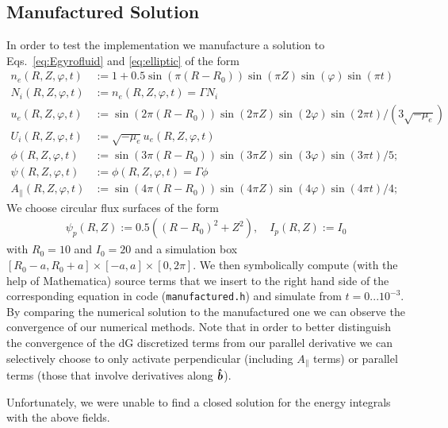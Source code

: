 \subsection{Manufactured Solution}
In order to test the implementation we manufacture a solution to Eqs.~\eqref{eq:Egyrofluid} and \eqref{eq:elliptic} of the form
\begin{align*}
n_e(R,Z,\varphi, t) &:= 1 + 0.5\sin(\pi(R-R_0))\sin(\pi Z)\sin(\varphi)\sin(\pi t) \\
N_i(R,Z,\varphi, t) &:= n_e(R,Z,\varphi,t) = \Gamma N_i  \\
u_e(R,Z,\varphi, t) &:= \sin(2\pi(R-R_0))\sin(2\pi Z)\sin(2\varphi)\sin(2\pi t)/(3\sqrt{-\mu_e}) \\
U_i(R,Z,\varphi, t) &:= \sqrt{-\mu_e}u_e(R,Z,\varphi,t) \\
\phi(R,Z,\varphi,t) &:= \sin(3\pi(R-R_0))\sin(3\pi Z)\sin(3\varphi)\sin(3\pi t)/5; \\
\psi(R,Z,\varphi,t) &:= \phi(R,Z,\varphi, t) = \Gamma \phi \\
A_\parallel( R,Z,\varphi,t) &:= \sin(4\pi(R-R_0))\sin(4\pi Z)\sin(4\varphi)\sin(4\pi t)/4;
\end{align*}
We choose circular flux surfaces of the form
\begin{align*}
\psi_p(R,Z) :=0.5((R-R_0)^2 + Z^2),\quad
I_p(R,Z):=I_0
\end{align*}
with $R_0=10$ and $I_0=20$ and a simulation box $[R_0-a,R_0+a]\times[-a,a]\times[0,2\pi]$.
We then symbolically compute (with the help of Mathematica) source terms that we insert to the right hand side of
the corresponding equation in code (\texttt{manufactured.h}) and simulate from $t=0...10^{-3}$.
By comparing the numerical solution to the manufactured one we can observe the convergence of our numerical methods. Note that in order to better distinguish
the convergence of the dG discretized terms from our parallel derivative
we can selectively choose to only activate perpendicular (including $A_\parallel$ terms) or parallel terms (those that involve derivatives along $\bm{\hat{b}}$).

Unfortunately, we were unable to find a closed solution for the energy integrals with the above fields.


